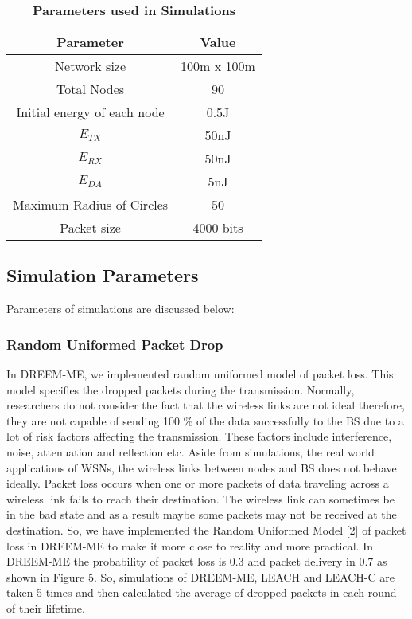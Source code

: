 \documentclass[journal]{IEEEtran}
\begin{document}
\begin{table}[ht]
\caption{\bf Parameters used in Simulations} \centering \begin{tabular}{|c| c|} \hline
Parameter & Value \\ [0.5ex] \hline Network size & 100m x 100m \\ Total Nodes & 90 \\
Initial energy of each node & 0.5J \\
$E_{TX}$ & 50nJ \\
$E_{RX}$ & 50nJ \\
$E_{DA}$ & 5nJ \\
Maximum Radius of Circles & 50 \\
Packet size & 4000 bits \\ [1ex] \hline \end{tabular}
\end{table}

\subsection{ Simulation Parameters }

Parameters of simulations are discussed below:

\subsubsection{ Random Uniformed Packet Drop }
In DREEM-ME, we implemented random uniformed model of packet loss. This model specifies the dropped packets during the transmission. Normally, researchers do not consider the fact that the wireless links are not ideal therefore, they are not capable of sending 100 \% of the data successfully to the BS due to a lot of risk factors affecting the transmission. These factors include interference, noise, attenuation and reflection etc. Aside from simulations, the real world applications of WSNs, the wireless links between nodes and BS does not behave ideally. Packet loss occurs when one or more packets of data traveling across a wireless link fails to reach their destination. The wireless link can sometimes be in the bad state and as a result maybe some packets may not be received at the destination. So, we have implemented the Random Uniformed Model [2] of packet loss in DREEM-ME to make it more close to reality and more practical. In DREEM-ME the probability of packet loss is 0.3 and packet delivery in 0.7 as shown in Figure 5. So, simulations of DREEM-ME, LEACH and LEACH-C are taken 5 times and then calculated the average of dropped packets in each round of their lifetime.
\end{document}
